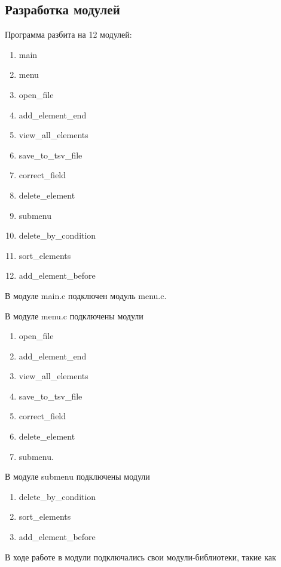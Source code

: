 \newpage

\subsection{Разработка модулей}

Программа разбита на 12 модулей:

\begin{enumerate}
    \item main
    \item menu
    \item open\_file
    \item add\_element\_end
    \item view\_all\_elements
    \item save\_to\_tsv\_file
    \item correct\_field
    \item delete\_element
    \item submenu
    \item delete\_by\_condition
    \item sort\_elements
    \item add\_element\_before
\end{enumerate}

В модуле main.c подключен модуль menu.c.

В модуле menu.c подключены модули

\begin{enumerate}
    \item open\_file
    \item add\_element\_end
    \item view\_all\_elements
    \item save\_to\_tsv\_file
    \item correct\_field
    \item delete\_element
    \item submenu.
\end{enumerate}

В модуле submenu подключены модули

\begin{enumerate}
    \item delete\_by\_condition
    \item sort\_elements
    \item add\_element\_before
\end{enumerate}

В ходе работе в модули подключались свои модули-библиотеки, такие как

